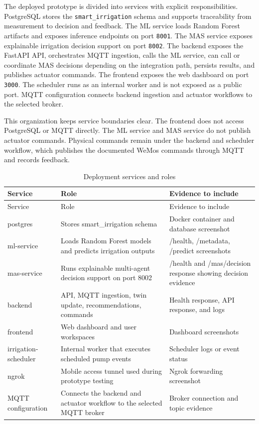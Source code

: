The deployed prototype is divided into services with explicit responsibilities. PostgreSQL stores the \texttt{smart\_irrigation} schema and supports traceability from measurement to decision and feedback. The ML service loads Random Forest artifacts and exposes inference endpoints on port \texttt{8001}. The MAS service exposes explainable irrigation decision support on port \texttt{8002}. The backend exposes the FastAPI API, orchestrates MQTT ingestion, calls the ML service, can call or coordinate MAS decisions depending on the integration path, persists results, and publishes actuator commands. The frontend exposes the web dashboard on port \texttt{3000}. The scheduler runs as an internal worker and is not exposed as a public port. MQTT configuration connects backend ingestion and actuator workflows to the selected broker.

This organization keeps service boundaries clear. The frontend does not access PostgreSQL or MQTT directly. The ML service and MAS service do not publish actuator commands. Physical commands remain under the backend and scheduler workflow, which publishes the documented WeMos commands through MQTT and records feedback.

\begin{footnotesize}
\setlength{\tabcolsep}{2pt}
\begin{longtable}{@{}>{\raggedright\arraybackslash}p{}>{\raggedright\arraybackslash}p{}>{\raggedright\arraybackslash}p{}@{}}
\caption{Deployment services and roles}
\label{tab:deployment_services_roles}\\
\toprule
Service & Role & Evidence to include \\
\midrule
\endfirsthead
\toprule
Service & Role & Evidence to include \\
\midrule
\endhead
postgres & Stores smart\_irrigation schema & Docker container and database screenshot \\
ml-service & Loads Random Forest models and predicts irrigation outputs & /health, /metadata, /predict screenshots \\
mas-service & Runs explainable multi-agent decision support on port 8002 & /health and /mas/decision response showing decision evidence \\
backend & API, MQTT ingestion, twin update, recommendations, commands & Health response, API response, and logs \\
frontend & Web dashboard and user workspaces & Dashboard screenshots \\
irrigation-scheduler & Internal worker that executes scheduled pump events & Scheduler logs or event status \\
ngrok & Mobile access tunnel used during prototype testing & Ngrok forwarding screenshot \\
MQTT configuration & Connects the backend and actuator workflow to the selected MQTT broker & Broker connection and topic evidence \\
\bottomrule
\end{longtable}
\end{footnotesize}

